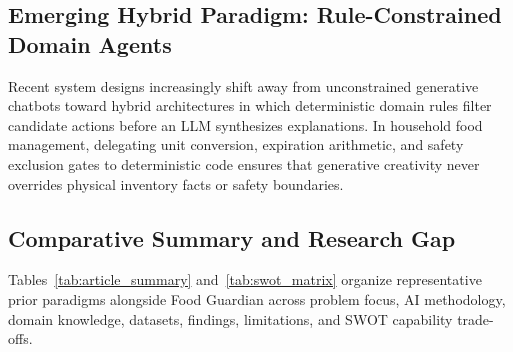 \documentclass[conference]{IEEEtran}
\begin{document}
\subsection{Emerging Hybrid Paradigm: Rule-Constrained Domain Agents}
Recent system designs increasingly shift away from unconstrained generative chatbots toward hybrid architectures in which deterministic domain rules filter candidate actions before an LLM synthesizes explanations. In household food management, delegating unit conversion, expiration arithmetic, and safety exclusion gates to deterministic code ensures that generative creativity never overrides physical inventory facts or safety boundaries.

\subsection{Comparative Summary and Research Gap}
Tables~\ref{tab:article_summary} and~\ref{tab:swot_matrix} organize representative prior paradigms alongside Food Guardian across problem focus, AI methodology, domain knowledge, datasets, findings, limitations, and SWOT capability trade-offs.
\end{document}
